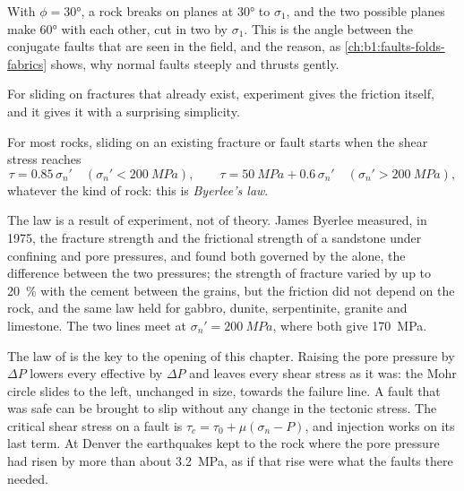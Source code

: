 With $\phi = \ang{30}$, a rock breaks on planes at \ang{30} to $\sigma_1$, and
the two possible planes make \ang{60} with each other, cut in two by
$\sigma_1$. This is the angle between the conjugate faults that are seen in
the field, and the reason, as \cref{ch:b1:faults-folds-fabrics} shows, why
normal faults  steeply and thrusts gently.

For sliding on fractures that already exist, experiment gives the friction
itself, and it gives it with a surprising simplicity.

\begin{proposition}\label{prop:b1:stress-strain-rheology:byerlee}
For most rocks, sliding on an existing fracture or fault starts when the shear
stress reaches
\[
  \tau = 0.85\,\sigma_n' \quad (\sigma_n' < \qty{200}{MPa}), \qquad
  \tau = \qty{50}{MPa} + 0.6\,\sigma_n' \quad (\sigma_n' > \qty{200}{MPa}),
\]
whatever the kind of rock: this is \emph{Byerlee's law}.
\end{proposition}
\admitted

The law is a result of experiment, not of theory. James Byerlee measured, in
1975, the fracture strength and the frictional strength of a sandstone under
confining and pore pressures, and found both governed by the 
alone, the difference between the two pressures; the strength of fracture
varied by up to \qty{20}{\percent} with the cement between the grains, but the
friction did not depend on the rock, and the same law held for gabbro,
dunite, serpentinite, granite and limestone. The two lines meet at
$\sigma_n' = \qty{200}{MPa}$, where both give \qty{170}{MPa}.

The law of  is the key to the opening of this chapter. Raising
the pore pressure by $\Delta P$ lowers every effective  by
$\Delta P$ and leaves every shear stress as it was: the Mohr circle slides to
the left, unchanged in size, towards the failure line. A fault that was safe
can be brought to slip without any change in the tectonic stress. The
critical shear stress on a fault is $\tau_c = \tau_0 + \mu(\sigma_n - P)$,
and injection works on its last term. At Denver the earthquakes kept to the
rock where the pore pressure had risen by more than about \qty{3.2}{MPa}, as
if that rise were what the faults there needed.

